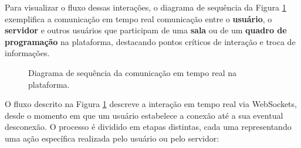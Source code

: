Para visualizar o fluxo dessas interações, o diagrama de sequência da Figura \ref{fig:websocket-flow} exemplifica a comunicação em tempo real comunicação entre o \textbf{usuário}, o \textbf{servidor} e outros usuários que participam de uma \textbf{sala} ou de um \textbf{quadro de programação} na plataforma, destacando pontos críticos de interação e troca de informações.

\begin{figure}[H] 
    \centering
    \caption{Diagrama de sequência da comunicação em tempo real na plataforma.}
    \label{fig:websocket-flow}
\end{figure}

 O fluxo descrito na Figura \ref{fig:websocket-flow} descreve a interação em tempo real via WebSockets, desde o momento em que um usuário estabelece a conexão até a sua eventual desconexão. O processo é dividido em etapas distintas, cada uma representando uma ação específica realizada pelo usuário ou pelo servidor:


